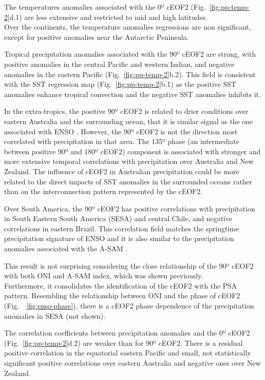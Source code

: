 \documentclass[pdflatex,sn-basic]{sn-jnl}
\theoremstyle{thmstyleone}%
\theoremstyle{thmstyletwo}%
\theoremstyle{thmstylethree}%
\begin{document}
The temperatures anomalies associated with the 0º cEOF2 (Fig.~\ref{fig:pp-temp-2}d.1) are less extensive and restricted to mid and high latitudes.\\
Over the continents, the temperature anomalies regressions are non significant, except for positive anomalies near the Antarctic Peninsula.

Tropical precipitation anomalies associated with the 90º cEOF2 are strong, with positive anomalies in the central Pacific and western Indian, and negative anomalies in the eastern Pacific (Fig.~\ref{fig:pp-temp-2}b.2).
This field is consistent with the SST regression map (Fig.~\ref{fig:pp-temp-2}b.1) as the positive SST anomalies enhance tropical convection and the negative SST anomalies inhibits it.

In the extra-tropics, the positive 90º cEOF2 is related to drier conditions over eastern Australia and the surrounding ocean, that it is similar signal as the one associated with ENSO \citep{cai2011}.
However, the 90º cEOF2 is not the direction most correlated with precipitation in that area.
The 135º phase (an intermediate between positive 90º and 180º cEOF2) component is associated with stronger and more extensive temporal correlations with precipitation over Australia and New Zealand.
The influence of cEOF2 in Australian precipitation could be more related to the direct impacts of SST anomalies in the surrounded oceans rather than on the interconnection pattern represented by the cEOF2.

Over South America, the 90º cEOF2 has positive correlations with precipitation in South Eastern South America (SESA) and central Chile, and negative correlations in eastern Brazil. This correlation field matches the springtime precipitation signature of ENSO \citep[e.g.][]{cai2020a} and it is also similar to the precipitation anomalies associated with the A-SAM \citep{campitelli2022}.

This result is not surprising considering the close relationship of the 90º cEOF2 with both ONI and A-SAM index, which was shown previously.\\
Furthermore, it consolidates the identification of the cEOF2 with the PSA pattern. Resembling the relationship between ONI and the phase of cEOF2 (Fig.~~\ref{fig:enso-phase}), there is a cEOF2 phase dependence of the precipitation anomalies in SESA (not shown).

The correlation coefficients between precipitation anomalies and the 0º cEOF2 (Fig.~\ref{fig:pp-temp-2}d.2) are weaker than for 90º cEOF2.
There is a residual positive correlation in the equatorial eastern Pacific and small, not statistically significant positive correlations over eastern Australia and negative ones over New Zealand.
\end{document}
